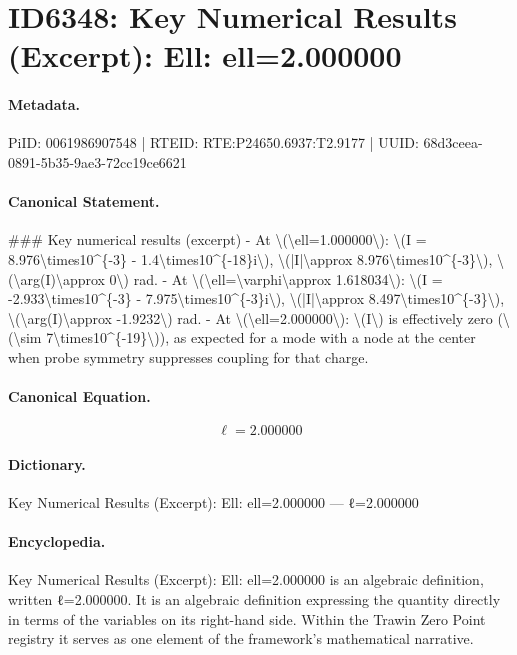 \section*{ID6348: Key Numerical Results (Excerpt): Ell: ell=2.000000}
\paragraph{Metadata.}
PiID: 0061986907548 | RTEID: RTE:P24650.6937:T2.9177 | UUID: 68d3ceea-0891-5b35-9ae3-72cc19ce6621

\paragraph{Canonical Statement.}
\#\#\# Key numerical results (excerpt) - At \textbackslash{}(\textbackslash{}ell=1.000000\textbackslash{}): \textbackslash{}(I = 8.976\textbackslash{}times10\textasciicircum{}\{-3\} - 1.4\textbackslash{}times10\textasciicircum{}\{-18\}i\textbackslash{}), \textbackslash{}(|I|\textbackslash{}approx 8.976\textbackslash{}times10\textasciicircum{}\{-3\}\textbackslash{}), \textbackslash{}(\textbackslash{}arg(I)\textbackslash{}approx 0\textbackslash{}) rad. - At \textbackslash{}(\textbackslash{}ell=\textbackslash{}varphi\textbackslash{}approx 1.618034\textbackslash{}): \textbackslash{}(I = -2.933\textbackslash{}times10\textasciicircum{}\{-3\} - 7.975\textbackslash{}times10\textasciicircum{}\{-3\}i\textbackslash{}), \textbackslash{}(|I|\textbackslash{}approx 8.497\textbackslash{}times10\textasciicircum{}\{-3\}\textbackslash{}), \textbackslash{}(\textbackslash{}arg(I)\textbackslash{}approx -1.9232\textbackslash{}) rad. - At \textbackslash{}(\textbackslash{}ell=2.000000\textbackslash{}): \textbackslash{}(I\textbackslash{}) is effectively zero (\textbackslash{}(\textbackslash{}sim 7\textbackslash{}times10\textasciicircum{}\{-19\}\textbackslash{})), as expected for a mode with a node at the center when probe symmetry suppresses coupling for that charge.

\paragraph{Canonical Equation.}
\[
\ell=2.000000
\]

\paragraph{Dictionary.}
Key Numerical Results (Excerpt): Ell: ell=2.000000 — ℓ=2.000000

\paragraph{Encyclopedia.}
Key Numerical Results (Excerpt): Ell: ell=2.000000 is an algebraic definition, written ℓ=2.000000. It is an algebraic definition expressing the quantity directly in terms of the variables on its right-hand side. Within the Trawin Zero Point registry it serves as one element of the framework's mathematical narrative.
